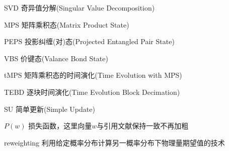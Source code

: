 
\begin{notation}

  \begin{notationlist}{2em}
  	\item[SVD]		奇异值分解(Singular Value Decomposition)
	\item[MPS]		矩阵乘积态(Matrix Product State)
	\item[PEPS]		投影纠缠(对)态(Projected Entangled Pair State)
	\item[VBS]		价键态(Valance Bond State)
	\item[tMPS]		矩阵乘积态的时间演化(Time Evolution with MPS)
	\item[TEBD]		逐块时间演化(Time Evolution Block Decimation)
	\item[SU]		简单更新(Simple Update)
    \item[$P(w)$]	损失函数，这里向量$w$与引用文献保持一致不再加粗
    \item[reweighting] 利用给定概率分布计算另一概率分布下物理量期望值的技术
  \end{notationlist}

\end{notation}





